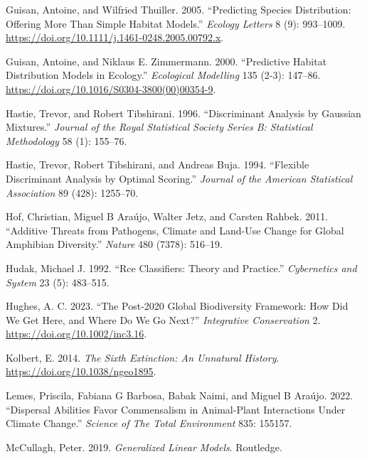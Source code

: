 \documentclass[
]{article}
\newlength{\cslhangindent}
\newenvironment{CSLReferences}[2] %
 {\begin{list}{}{%
  \setlength{\itemindent}{0pt}
  \setlength{\leftmargin}{0pt}
  \setlength{\parsep}{0pt}
  \ifodd #1
   \setlength{\leftmargin}{\cslhangindent}
   \setlength{\itemindent}{-1\cslhangindent}
  \fi
  \setlength{\itemsep}{#2\baselineskip}}}
 {\end{list}}
\begin{document}
\begin{CSLReferences}{1}{0}
Guisan, Antoine, and Wilfried Thuiller. 2005. {``Predicting Species
Distribution: Offering More Than Simple Habitat Models.''} \emph{Ecology
Letters} 8 (9): 993--1009.
\url{https://doi.org/10.1111/j.1461-0248.2005.00792.x}.

Guisan, Antoine, and Niklaus E. Zimmermann. 2000. {``Predictive Habitat
Distribution Models in Ecology.''} \emph{Ecological Modelling} 135
(2-3): 147--86. \url{https://doi.org/10.1016/S0304-3800(00)00354-9}.

Hastie, Trevor, and Robert Tibshirani. 1996. {``Discriminant Analysis by
Gaussian Mixtures.''} \emph{Journal of the Royal Statistical Society
Series B: Statistical Methodology} 58 (1): 155--76.

Hastie, Trevor, Robert Tibshirani, and Andreas Buja. 1994. {``Flexible
Discriminant Analysis by Optimal Scoring.''} \emph{Journal of the
American Statistical Association} 89 (428): 1255--70.

Hof, Christian, Miguel B Araújo, Walter Jetz, and Carsten Rahbek. 2011.
{``Additive Threats from Pathogens, Climate and Land-Use Change for
Global Amphibian Diversity.''} \emph{Nature} 480 (7378): 516--19.

Hudak, Michael J. 1992. {``Rce Classifiers: Theory and Practice.''}
\emph{Cybernetics and System} 23 (5): 483--515.

Hughes, A. C. 2023. {``The Post‐2020 Global Biodiversity Framework: How
Did We Get Here, and Where Do We Go Next?''} \emph{Integrative
Conservation} 2. \url{https://doi.org/10.1002/inc3.16}.

Kolbert, E. 2014. \emph{The Sixth Extinction: An Unnatural History}.
\url{https://doi.org/10.1038/ngeo1895}.

Lemes, Priscila, Fabiana G Barbosa, Babak Naimi, and Miguel B Araújo.
2022. {``Dispersal Abilities Favor Commensalism in Animal-Plant
Interactions Under Climate Change.''} \emph{Science of The Total
Environment} 835: 155157.

McCullagh, Peter. 2019. \emph{Generalized Linear Models}. Routledge.


\end{CSLReferences}
\end{document}
